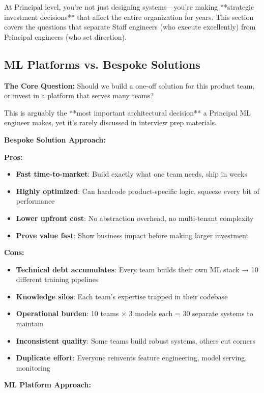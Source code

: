 \documentclass[10pt]{article}
\begin{document}
At Principal level, you're not just designing systems—you're making **strategic investment decisions** that affect the entire organization for years. This section covers the questions that separate Staff engineers (who execute excellently) from Principal engineers (who set direction).

\subsection{ML Platforms vs. Bespoke Solutions}

\textbf{The Core Question:} Should we build a one-off solution for this product team, or invest in a platform that serves many teams?

This is arguably the **most important architectural decision** a Principal ML engineer makes, yet it's rarely discussed in interview prep materials.

\textbf{Bespoke Solution Approach:}

\textbf{Pros:}
\begin{itemize}
\item \textbf{Fast time-to-market}: Build exactly what one team needs, ship in weeks
\item \textbf{Highly optimized}: Can hardcode product-specific logic, squeeze every bit of performance
\item \textbf{Lower upfront cost}: No abstraction overhead, no multi-tenant complexity
\item \textbf{Prove value fast}: Show business impact before making larger investment
\end{itemize}

\textbf{Cons:}
\begin{itemize}
\item \textbf{Technical debt accumulates}: Every team builds their own ML stack → 10 different training pipelines
\item \textbf{Knowledge silos}: Each team's expertise trapped in their codebase
\item \textbf{Operational burden}: 10 teams × 3 models each = 30 separate systems to maintain
\item \textbf{Inconsistent quality}: Some teams build robust systems, others cut corners
\item \textbf{Duplicate effort}: Everyone reinvents feature engineering, model serving, monitoring
\end{itemize}

\textbf{ML Platform Approach:}
\end{document}
